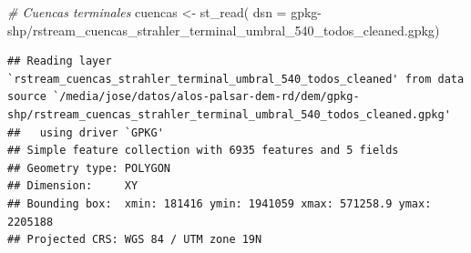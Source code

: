 \documentclass[spanish]{article}
\newenvironment{Shaded}{\begin{snugshade}}{\end{snugshade}}
\newcommand{\AttributeTok}[1]{\textcolor[rgb]{0.77,0.63,0.00}{#1}}
\newcommand{\CommentTok}[1]{\textcolor[rgb]{0.56,0.35,0.01}{\textit{#1}}}
\newcommand{\ControlFlowTok}[1]{\textcolor[rgb]{0.13,0.29,0.53}{\textbf{#1}}}
\newcommand{\DecValTok}[1]{\textcolor[rgb]{0.00,0.00,0.81}{#1}}
\newcommand{\FunctionTok}[1]{\textcolor[rgb]{0.00,0.00,0.00}{#1}}
\newcommand{\NormalTok}[1]{#1}
\newcommand{\OtherTok}[1]{\textcolor[rgb]{0.56,0.35,0.01}{#1}}
\newcommand{\SpecialCharTok}[1]{\textcolor[rgb]{0.00,0.00,0.00}{#1}}
\newcommand{\StringTok}[1]{\textcolor[rgb]{0.31,0.60,0.02}{#1}}
\begin{document}
\begin{Shaded}
\begin{Highlighting}[]
\CommentTok{\# Cuencas terminales}
\NormalTok{cuencas }\OtherTok{\textless{}{-}} \FunctionTok{st\_read}\NormalTok{(}
  \AttributeTok{dsn =} \StringTok{\textquotesingle{}gpkg{-}shp/rstream\_cuencas\_strahler\_terminal\_umbral\_540\_todos\_cleaned.gpkg\textquotesingle{}}\NormalTok{)}
\end{Highlighting}
\end{Shaded}

\begin{verbatim}
## Reading layer `rstream_cuencas_strahler_terminal_umbral_540_todos_cleaned' from data source `/media/jose/datos/alos-palsar-dem-rd/dem/gpkg-shp/rstream_cuencas_strahler_terminal_umbral_540_todos_cleaned.gpkg' 
##   using driver `GPKG'
## Simple feature collection with 6935 features and 5 fields
## Geometry type: POLYGON
## Dimension:     XY
## Bounding box:  xmin: 181416 ymin: 1941059 xmax: 571258.9 ymax: 2205188
## Projected CRS: WGS 84 / UTM zone 19N
\end{verbatim}

\begin{Shaded}
\end{Shaded}
\end{document}
